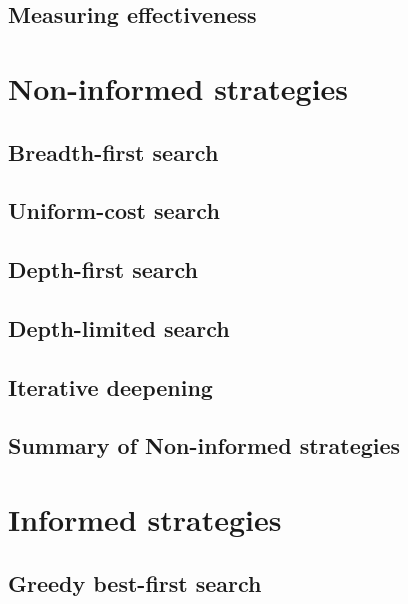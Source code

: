 \documentclass[12pt,a4paper,twoside]{book}
\begin{document}
\section{Measuring effectiveness}

\label{s_1_2}

\chapter{Non-informed strategies}

\label{c_2}

\section{Breadth-first search}

\label{s_2_1}

\section{Uniform-cost search}

\label{s_2_2}

\section{Depth-first search}

\label{s_2_3}

\section{Depth-limited search}

\label{s_2_4}

\section{Iterative deepening}

\label{s_2_5}

\section{Summary of Non-informed strategies}

\label{s_2_6}

\chapter{Informed strategies}

\label{c_3}

\section{Greedy best-first search}

\label{s_3_1}
\end{document}
